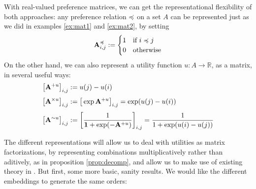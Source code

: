 \documentclass{article}
\begin{document}
	With real-valued preference matrices, we can get the representational flexibility of both approaches: any preference relation $\preccurlyeq$ on a set $A$ can be represented just as we did in examples \ref{ex:mat1} and \ref{ex:mat2}, by setting
	\[ \mathbf A^\preccurlyeq_{i,j} := \begin{cases} 1 & \text{if $i \preccurlyeq j$} \\ 0 & \text{otherwise}\end{cases}\]
	On the other hand, we can also represent a utility function $u : A \to \mathbb R$, as a matrix, in several useful ways:
	\begin{align*}
		\big[\mathbf A^{+ u}\big]_{i,j} &:=   u(j) - u(i) 	\\[0.3em]
		\big[\mathbf A^{\times u}\big]_{i,j} &:= \big[\exp \mathbf A^{+u}\big]_{i,j} = \exp ( u(j) - u(i) ) \\[0.3em]
		\big[\mathbf A^{\sim u}\big]_{i,j} &:= \left[\frac{1}{\mathbf 1 + \exp(- \mathbf A^{+ u})}\right]_{i,j} = \frac{1}{1+\exp ( u(i) - u(j) )}
	\end{align*}

	The different representations will allow us to deal with utilities as matrix factorizations, by representing combinations multiplicatively rather than aditively, as in proposition \ref{prop:decomp}, and allow us to make use of existing theory in \cite{elsner2004max}. But first, some more basic, sanity results. We would like the different embeddings to generate the same orders:
\end{document}
